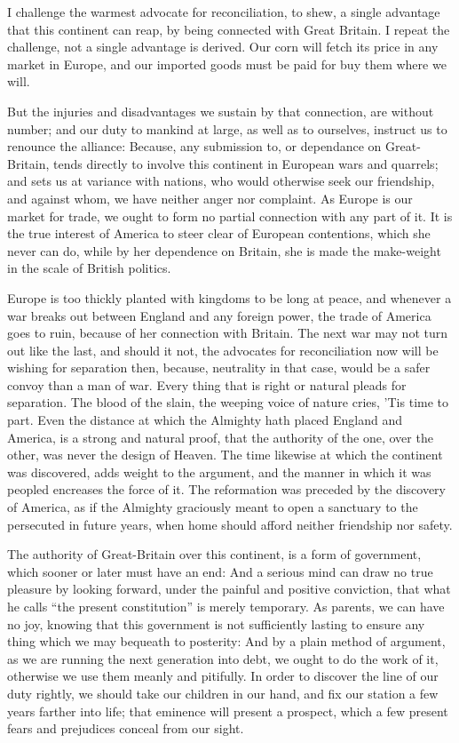 \documentclass[12pt,oneside]{memoir}
\begin{document}
I challenge the warmest advocate for reconciliation, to shew, a single advantage that this continent can reap, by being connected with Great Britain. I repeat the challenge, not a single advantage is derived. Our corn will fetch its price in any market in Europe, and our imported goods must be paid for buy them where we will.

But the injuries and disadvantages we sustain by that connection, are without number; and our duty to mankind at large, as well as to ourselves, instruct us to renounce the alliance: Because, any submission to, or dependance on Great-Britain, tends directly to involve this continent in European wars and quarrels; and sets us at variance with nations, who would otherwise seek our friendship, and against whom, we have neither anger nor complaint. As Europe is our market for trade, we ought to form no partial connection with any part of it. It is the true interest of America to steer clear of European contentions, which she never can do, while by her dependence on Britain, she is made the make-weight in the scale of British politics.

Europe is too thickly planted with kingdoms to be long at peace, and whenever a war breaks out between England and any foreign power, the trade of America goes to ruin, because of her connection with Britain. The next war may not turn out like the last, and should it not, the advocates for reconciliation now will be wishing for separation then, because, neutrality in that case, would be a safer convoy than a man of war. Every thing that is right or natural pleads for separation. The blood of the slain, the weeping voice of nature cries, 'Tis time to part. Even the distance at which the Almighty hath placed England and America, is a strong and natural proof, that the authority of the one, over the other, was never the design of Heaven. The time likewise at which the continent was discovered, adds weight to the argument, and the manner in which it was peopled encreases the force of it. The reformation was preceded by the discovery of America, as if the Almighty graciously meant to open a sanctuary to the persecuted in future years, when home should afford neither friendship nor safety.

The authority of Great-Britain over this continent, is a form of government, which sooner or later must have an end: And a serious mind can draw no true pleasure by looking forward, under the painful and positive conviction, that what he calls ``the present constitution'' is merely temporary. As parents, we can have no joy, knowing that this government is not sufficiently lasting to ensure any thing which we may bequeath to posterity: And by a plain method of argument, as we are running the next generation into debt, we ought to do the work of it, otherwise we use them meanly and pitifully. In order to discover the line of our duty rightly, we should take our children in our hand, and fix our station a few years farther into life; that eminence will present a prospect, which a few present fears and prejudices conceal from our sight.
\end{document}
